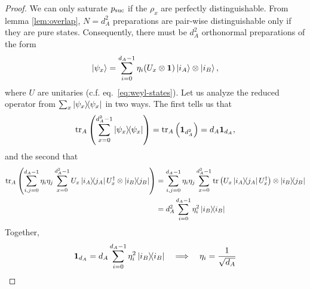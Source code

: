     \selftest*
    \begin{proof}
        We can only saturate $p_{\text{suc}}$ if the $\rho_x$ are perfectly distinguishable. From lemma \ref{lem:overlap}, $N = d_A^2$ preparations are pair-wise distinguishable only if they are pure states. Consequently, there must be $d_A^2$ orthonormal preparations of the form
        $$
            \ket{\psi_x} = \sum_{i = 0}^{d_A - 1} \eta_i (U_x \otimes \mathbf{1}) \ket{i_A} \otimes \ket{i_B} ,
        $$
        where $U$ are unitaries (c.f. eq.~\eqref{eq:weyl-states}). Let us analyze the reduced operator from $\sum_x \ketbra{\psi_x}{\psi_x}$ in two ways. The first tells us that
        $$
            \text{tr}_{A}\left( \sum_{x=0}^{d_A^2 - 1} \ketbra{\psi_x}{\psi_x} \right) = \text{tr}_{A}\left( \mathbf{1}_{d_A^2} \right) = d_A \mathbf{1}_{d_A} ,
        $$
        and the second that
        \begin{align*}
            \text{tr}_{A}\left( \sum_{i,j=0}^{d_A - 1} \eta_i \eta_j \sum_{x=0}^{d_A^2 - 1} U_x \ketbra{i_A}{j_A} U_x^\dagger \otimes \ketbra{i_B}{j_B} \right)
            &= \sum_{i,j=0}^{d_A - 1} \eta_i \eta_j \sum_{x=0}^{d_A^2 - 1} \text{tr}\left( U_x \ketbra{i_A}{j_A} U_x^\dagger \right) \otimes \ketbra{i_B}{j_B} \\
            &= d_A^2 \sum_{i=0}^{d_A - 1} \eta_i^2 \ketbra{i_B}{i_B}
        \end{align*}
        Together,
        $$
            \mathbf{1}_{d_A} = d_A \sum_{i=0}^{d_A-1} \eta_i^2 \ketbra{i_B}{i_B} \quad\Longrightarrow\quad \eta_i = \frac{1}{\sqrt{d_A}}
        $$
    \end{proof}


